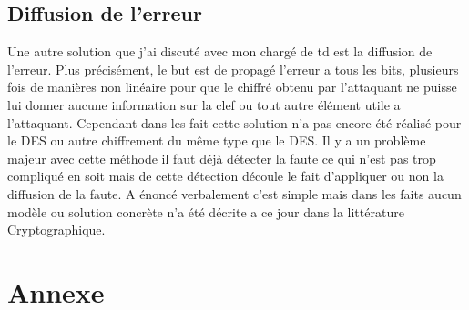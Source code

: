 \documentclass[a4paper]{report}
\begin{document}
			\section{Diffusion de l'erreur}
				Une autre solution que j'ai discuté avec mon chargé de td est la diffusion de l'erreur. Plus précisément, le but est de propagé l'erreur a tous les bits, plusieurs fois de manières non linéaire pour que le chiffré obtenu par l'attaquant ne puisse lui donner aucune information sur la clef ou tout autre élément utile a l'attaquant.
				Cependant dans les fait cette solution n'a pas encore été réalisé pour le DES ou autre chiffrement du même type que le DES. Il y a un problème majeur avec cette méthode il faut déjà détecter la faute ce qui n'est pas trop compliqué en soit mais de cette détection découle le fait d'appliquer ou non la diffusion de la faute. A énoncé verbalement c'est simple mais dans les faits aucun modèle ou solution concrète n'a été décrite a ce jour dans la littérature Cryptographique.
		
		\chapter{Annexe}


		
\end{document}
